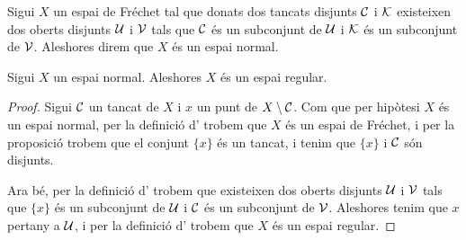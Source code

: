 \documentclass[../Apunts.tex]{subfiles}
\begin{document}
	\begin{definition}
		\label{def:espai normal}
		Sigui \(X\) un espai de Fréchet tal que donats dos tancats disjunts \(\mathcal{C}\) i \(\mathcal{K}\) existeixen dos oberts disjunts \(\mathcal{U}\) i \(\mathcal{V}\) tals que \(\mathcal{C}\) és un subconjunt de \(\mathcal{U}\) i \(\mathcal{K}\) és un subconjunt de \(\mathcal{V}\). Aleshores direm que \(X\) és un espai normal.
	\end{definition}
	\begin{proposition}
		\label{prop:els espais normals són espais regulars}
		Sigui \(X\) un espai normal. Aleshores \(X\) és un espai regular.
		\begin{proof}
			Sigui \(\mathcal{C}\) un tancat de \(X\) i \(x\) un punt de \(X\setminus\mathcal{C}\). Com que per hipòtesi \(X\) és un espai normal, per la definició d' trobem que \(X\) és un espai de Fréchet, i per la proposició  trobem que el conjunt \(\{x\}\) és un tancat, i tenim que \(\{x\}\) i \(\mathcal{C}\) són disjunts.
			
			Ara bé, per la definició d' trobem que existeixen dos oberts disjunts \(\mathcal{U}\) i \(\mathcal{V}\) tals que \(\{x\}\) és un subconjunt de \(\mathcal{U}\) i \(\mathcal{C}\) és un subconjunt de \(\mathcal{V}\). Aleshores tenim que \(x\) pertany a \(\mathcal{U}\), i per la definició d' trobem que \(X\) és un espai regular.
		\end{proof}
	\end{proposition}
\end{document}
